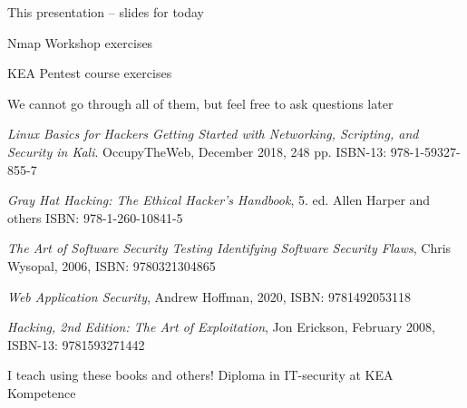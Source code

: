 \documentclass[Screen16to9,17pt]{foils}
\begin{document}

\begin{list2}
\item This presentation -- slides for today


\item Nmap Workshop exercises\\{\footnotesize
{}}
\item KEA Pentest course exercises\\{\footnotesize
{}}
\end{list2}

\centerline{We cannot go through all of them, but feel free to ask questions later}



\begin{list2}
\item \emph{Linux Basics for Hackers Getting Started with Networking, Scripting, and Security in Kali}. OccupyTheWeb, December 2018, 248 pp. ISBN-13: 978-1-59327-855-7
\item \emph{Gray Hat Hacking: The Ethical Hacker's Handbook}, 5. ed. Allen Harper and others ISBN: 978-1-260-10841-5
\item \emph{The Art of Software Security Testing Identifying Software Security Flaws}, Chris Wysopal, 2006, ISBN: 9780321304865
\item \emph{Web Application Security}, Andrew Hoffman, 2020, ISBN: 9781492053118
\item \emph{Hacking, 2nd Edition: The Art of Exploitation}, Jon Erickson, February 2008, ISBN-13: 9781593271442
\end{list2}

{\footnotesize
I teach using these books and others! Diploma in IT-security at KEA Kompetence\\
 }




\end{document}
